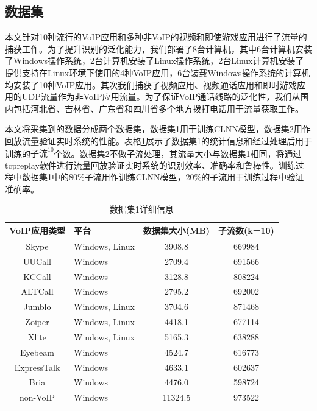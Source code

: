 \subsection{数据集}
本文针对10种流行的VoIP应用和多种非VoIP的视频和即使游戏应用进行了流量的捕获工作。为了提升识别的泛化能力，我们部署了8台计算机，其中6台计算机安装了Windows操作系统，2台计算机安装了Linux操作系统，2台Linux计算机安装了提供支持在Linux环境下使用的4种VoIP应用，6台装载Windows操作系统的计算机均安装了10种VoIP应用。其次我们捕获了视频应用、视频通话应用和即时游戏应用的UDP流量作为非VoIP应用流量。为了保证VoIP通话线路的泛化性，我们从国内包括河北省、吉林省、广东省和四川省多个地方拨打电话用于流量获取工作。

本文将采集到的数据分成两个数据集，数据集1用于训练CLNN模型，数据集2用作回放流量验证实时系统的性能。表格\ref{tab:traffic}展示了数据集1的统计信息和经过处理后用于训练的$\text{子流}^{10}$个数。数据集2不做子流处理，其流量大小与数据集1相同，将通过tcpreplay软件进行流量回放验证实时系统的识别效率、准确率和鲁棒性。训练过程中数据集1中的80\%子流用作训练CLNN模型，20\%的子流用于训练过程中验证准确率。

\begin{table}[htbp]
  \caption{数据集1详细信息}
  \label{tab:traffic}
  \centering
  \begin{tabular}{c l c c}
    \hline
    \textbf{VoIP应用类型} & \textbf{平台} & \textbf{数据集大小(MB)}& \textbf{子流数(k=10)}\\
    \hline
    Skype      & Windows, Linux  & 3908.8  &  669984  \\
    UUCall      & Windows  & 2709.4  &  691566  \\
    KCCall      & Windows  & 3128.8  &  808224  \\
    ALTCall      & Windows  & 2795.2  &  692002  \\
    Jumblo      & Windows, Linux  & 3704.6  &  871468  \\
    Zoiper      & Windows, Linux  & 4418.1  &  677114  \\
    Xlite      & Windows, Linux  & 5165.3  &  638288  \\
    Eyebeam      & Windows  & 4524.7  &  616773  \\
    ExpressTalk      & Windows  & 4633.1  &  602637  \\
    Bria      & Windows  & 4476.0  &  598724  \\
    non-VoIP      & Windows  & 11324.5  &  973522  \\
    \hline
  \end{tabular}
\end{table}

